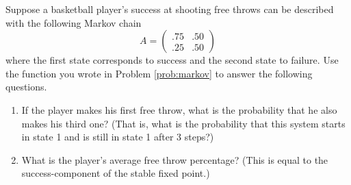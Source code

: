\begin{problem}
Suppose a basketball player's success at shooting free throws can be described with the following Markov chain
\[
A = \begin{pmatrix}.75&.50\\.25&.50\end{pmatrix}
\]
where the first state corresponds to success and the second state to failure. Use the function you wrote in Problem \ref{prob:markov} to answer the following questions.
\begin{enumerate}
\item If the player makes his first free throw, what is the probability that he also makes his third one? 
(That is, what is the probability that this system starts in state 1 and is still in state 1 after 3 steps?)
\item What is the player's average free throw percentage? 
(This is equal to the success-component of the stable fixed point.)
\end{enumerate}
\label{prob:markov_freethrow}
\end{problem}

